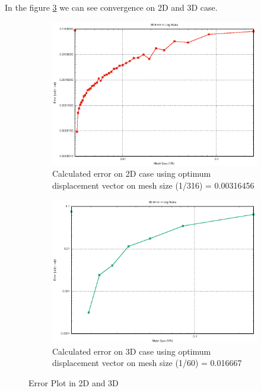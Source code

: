 \documentclass[a4paper,11pt]{article}
\begin{document}
\newline
In the figure \ref{fig:errorplot} we can see convergence on 2D and 3D case.
\begin{figure}[h!]
	\begin{subfigure}[b]{0.5\linewidth}
		\centering
		\includegraphics[width=\linewidth]{picture/conference/2derror}
		\caption{Calculated error on 2D case using optimum displacement vector on mesh size (1/316) = 0.00316456}
		\label{fig:2derror}
	\end{subfigure}
	\quad
	\begin{subfigure}[b]{0.5\linewidth}
		\centering
		\includegraphics[width=\linewidth]{picture/conference/3derror}
		\caption{Calculated error on 3D case using optimum displacement vector on mesh size (1/60) = 0.016667}
		\label{fig:3derror}
	\end{subfigure}
	\caption{Error Plot in 2D and 3D}
	\label{fig:errorplot}
\end{figure}
\end{document}
